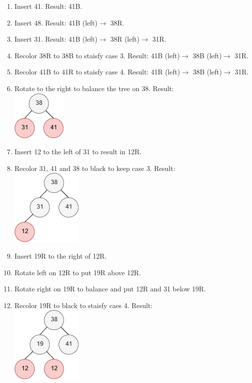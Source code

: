 \documentclass{article}
\begin{document}
\begin{enumerate}
    \begin{enumerate}
      \item Insert 41. Result: 41B.
      \item Insert 48. Result: 41B (left)$\rightarrow$ 38R.
      \item Insert 31. Result: 41B (left)$\rightarrow$ 38R (left)$\rightarrow$ 31R.
      \item Recolor 38R to 38B to staisfy case 3. Result: 41B (left)$\rightarrow$ 38B (left)$\rightarrow$ 31R.
      \item Recolor 41B to 41R to staisfy case 4. Result: 41R (left)$\rightarrow$ 38B (left)$\rightarrow$ 31R.
      \item Rotate to the right to balance the tree on 38. Result:\\
      \includegraphics[scale=0.5]{1a.png}
      \item Insert 12 to the left of 31 to result in 12R.
      \item Recolor 31, 41 and 38 to black to keep case 3. Result:\\
      \includegraphics[scale=0.5]{1b.png}
      \item Insert 19R to the right of 12R. 
      \item Rotate left on 12R to put 19R above 12R.
      \item Rotate right on 19R to balance and put 12R and 31 below 19R.
      \item Recolor 19R to black to staisfy caes 4. Result:\\
      \includegraphics[scale=0.5]{1c.png}

\end{enumerate}
\end{enumerate}
\end{document}
